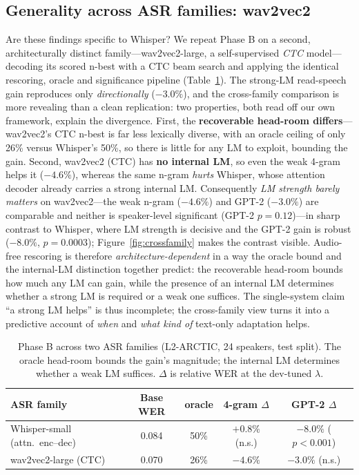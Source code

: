 \documentclass[conference]{IEEEtran}
\begin{document}
\subsection{Generality across ASR families: wav2vec2}
\label{sec:generality}
Are these findings specific to Whisper? We repeat Phase B on a second, architecturally distinct family---wav2vec2-large, a self-supervised \emph{CTC} model---decoding its scored n-best with a CTC beam search and applying the identical rescoring, oracle and significance pipeline (Table~\ref{tab:family}). The strong-LM read-speech gain reproduces only \emph{directionally} ($-3.0\%$), and the cross-family comparison is more revealing than a clean replication: two properties, both read off our own framework, explain the divergence. First, the \textbf{recoverable head-room differs}---wav2vec2's CTC n-best is far less lexically diverse, with an oracle ceiling of only 26\% versus Whisper's 50\%, so there is little for any LM to exploit, bounding the gain. Second, wav2vec2 (CTC) has \textbf{no internal LM}, so even the weak 4-gram helps it ($-4.6\%$), whereas the same n-gram \emph{hurts} Whisper, whose attention decoder already carries a strong internal LM. Consequently \emph{LM strength barely matters} on wav2vec2---the weak n-gram ($-4.6\%$) and GPT-2 ($-3.0\%$) are comparable and neither is speaker-level significant (GPT-2 $p=0.12$)---in sharp contrast to Whisper, where LM strength is decisive and the GPT-2 gain is robust ($-8.0\%$, $p=0.0003$); Figure~\ref{fig:crossfamily} makes the contrast visible. Audio-free rescoring is therefore \emph{architecture-dependent} in a way the oracle bound and the internal-LM distinction together predict: the recoverable head-room bounds how much any LM can gain, while the presence of an internal LM determines whether a strong LM is required or a weak one suffices. The single-system claim ``a strong LM helps'' is thus incomplete; the cross-family view turns it into a predictive account of \emph{when} and \emph{what kind of} text-only adaptation helps.

\begin{table}[t]
\centering
\caption{Phase B across two ASR families (L2-ARCTIC, 24 speakers, test split). The oracle head-room bounds the gain's magnitude; the internal LM determines whether a weak LM suffices. $\Delta$ is relative WER at the dev-tuned $\lambda$.}
\label{tab:family}
\begin{tabular}{@{}lcccc@{}}
\toprule
ASR family & Base WER & oracle & 4-gram $\Delta$ & GPT-2 $\Delta$ \\
\midrule
Whisper-small (attn.\ enc--dec) & 0.084 & 50\% & $+0.8\%$ (n.s.) & $-8.0\%$ ($p{<}0.001$) \\
wav2vec2-large (CTC) & 0.070 & 26\% & $-4.6\%$ & $-3.0\%$ (n.s.) \\
\bottomrule
\end{tabular}
\end{table}
\end{document}
